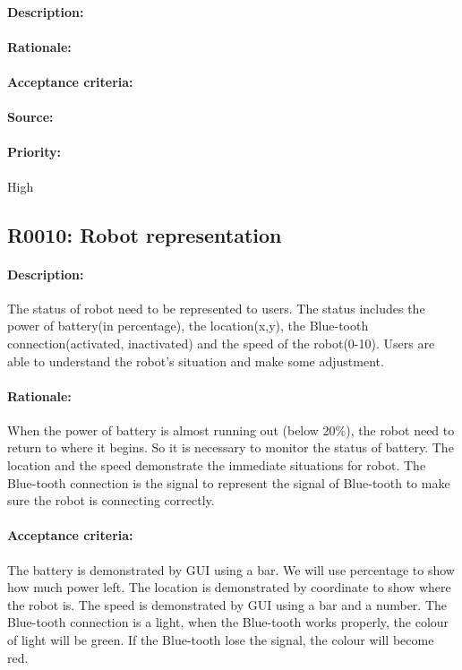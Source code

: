 \documentclass[11pt, a4paper]{report}
\begin{document}
\paragraph{Description:}

\paragraph{Rationale:}

\paragraph{Acceptance criteria:}

\paragraph{Source:}

\paragraph{Priority:}
High

\subsection{R0010: Robot representation}
\paragraph{Description:}
The status of robot need to be represented to users. The status includes the power of battery(in percentage), the location(x,y), the Blue-tooth connection(activated, inactivated) and the speed of the robot(0-10). Users are able to understand the  robot's situation and make some adjustment.
\paragraph{Rationale:}
When the power of battery is almost running out (below 20\%), the robot need to return to where it begins. So it is necessary to monitor the status of battery. The location and the speed demonstrate the immediate situations for robot. The Blue-tooth connection is the signal to represent the signal of Blue-tooth to make sure the robot is connecting correctly.
\paragraph{Acceptance criteria:}
The battery is demonstrated by GUI using a bar. We will use percentage to show how much power left. The location is demonstrated by coordinate to show where the robot is. 
The speed is demonstrated by GUI using a bar and a number. 
The Blue-tooth connection is a light, when the Blue-tooth works properly, the colour of  light will be green. If the Blue-tooth lose the signal, the colour will become red.
\end{document}
